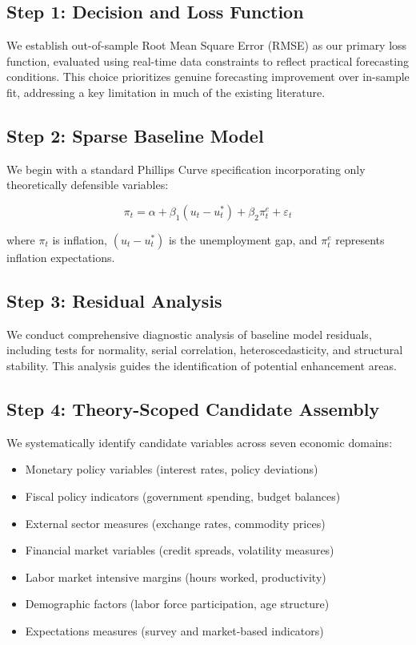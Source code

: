 \documentclass[12pt]{article}
\begin{document}
\subsection{Step 1: Decision and Loss Function}

We establish out-of-sample Root Mean Square Error (RMSE) as our primary loss function, evaluated using real-time data constraints to reflect practical forecasting conditions. This choice prioritizes genuine forecasting improvement over in-sample fit, addressing a key limitation in much of the existing literature.

\subsection{Step 2: Sparse Baseline Model}

We begin with a standard Phillips Curve specification incorporating only theoretically defensible variables:

\begin{equation}
\pi_t = \alpha + \beta_1 (u_t - u_t^*) + \beta_2 \pi_t^e + \varepsilon_t
\end{equation}

where $\pi_t$ is inflation, $(u_t - u_t^*)$ is the unemployment gap, and $\pi_t^e$ represents inflation expectations.

\subsection{Step 3: Residual Analysis}

We conduct comprehensive diagnostic analysis of baseline model residuals, including tests for normality, serial correlation, heteroscedasticity, and structural stability. This analysis guides the identification of potential enhancement areas.

\subsection{Step 4: Theory-Scoped Candidate Assembly}

We systematically identify candidate variables across seven economic domains:
\begin{itemize}
\item Monetary policy variables (interest rates, policy deviations)
\item Fiscal policy indicators (government spending, budget balances)
\item External sector measures (exchange rates, commodity prices)
\item Financial market variables (credit spreads, volatility measures)
\item Labor market intensive margins (hours worked, productivity)
\item Demographic factors (labor force participation, age structure)
\item Expectations measures (survey and market-based indicators)
\end{itemize}
\end{document}
